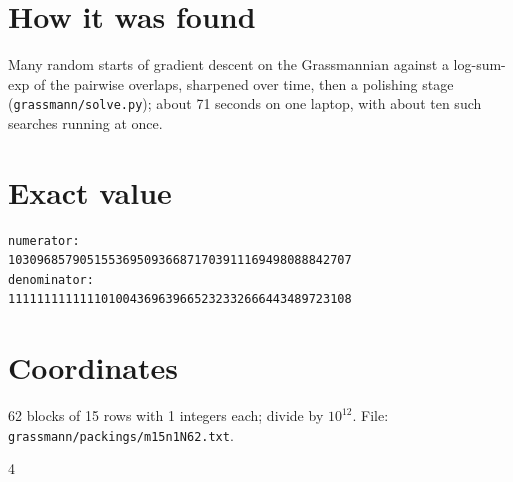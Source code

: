 \documentclass[11pt,a4paper]{article}
\begin{document}
\section{How it was found}
Many random starts of gradient descent on the Grassmannian against a log-sum-exp of the pairwise overlaps, sharpened over time, then a polishing stage (\texttt{grassmann/solve.py}); about 71 seconds on one laptop, with about ten such searches running at once.


\appendix
\section{Exact value}
{\small
\begin{verbatim}
numerator:
103096857905155369509366871703911169498088842707
denominator:
111111111111101004369639665232332666443489723108
\end{verbatim}}

\section{Coordinates}
62 blocks of 15 rows with 1 integers each; divide by $10^{12}$. File: \texttt{grassmann/packings/m15n1N62.txt}.
{\tiny
\begin{multicols}{4}
\end{multicols}}
\end{document}
